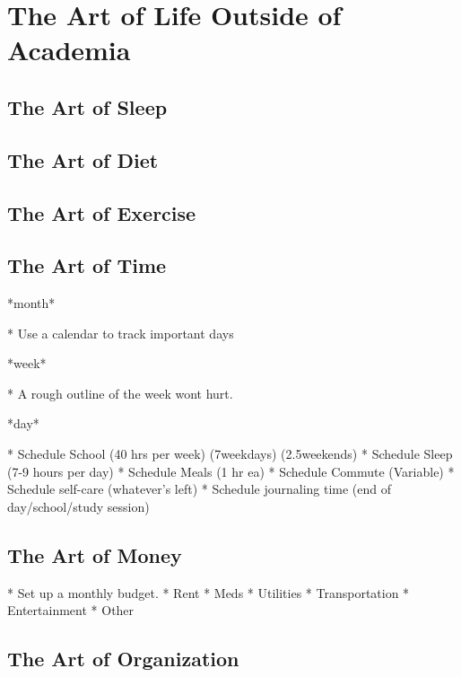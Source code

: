 \chapter{The Art of Life Outside of Academia}

\section{The Art of Sleep}

\section{The Art of Diet}

\section{The Art of Exercise}

\section{The Art of Time}

*month*

* Use a calendar to track important days

*week*

* A rough outline of the week wont hurt. 

*day*

* Schedule School (40 hrs per week) (7weekdays) (2.5weekends)
* Schedule Sleep  (7-9 hours per day)
* Schedule Meals  (1 hr ea)
* Schedule Commute (Variable)
* Schedule self-care (whatever's left)
* Schedule journaling time (end of day/school/study session)

\section{The Art of Money}

* Set up a monthly budget. 
* Rent
* Meds
* Utilities
* Transportation
* Entertainment
* Other

\section{The Art of Organization}
